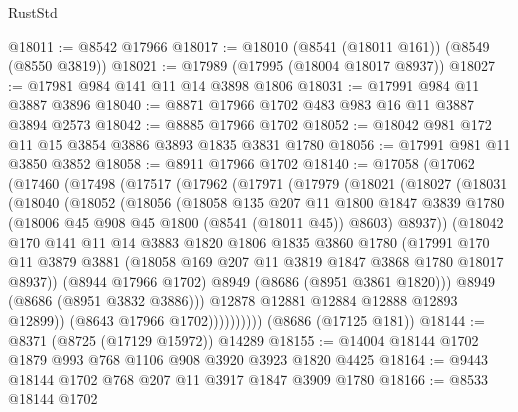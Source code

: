 \begin{lexlean}{RustStd}
\begin{coremodule}
@18011 := @8542 @17966
@18017 := @18010 (@8541 (@18011 @161)) (@8549 (@8550 @3819))
@18021 := @17989 (@17995 (@18004 @18017 @8937))
@18027 := @17981 @984 @141 @11 @14 @3898 @1806
@18031 := @17991 @984 @11 @3887 @3896
@18040 := @8871 @17966 @1702 @483 @983 @16 @11 @3887 @3894 @2573
@18042 := @8885 @17966 @1702
@18052 := @18042 @981 @172 @11 @15 @3854 @3886 @3893 @1835 @3831 @1780
@18056 := @17991 @981 @11 @3850 @3852
@18058 := @8911 @17966 @1702
@18140 := @17058
    (@17062
      (@17460
        (@17498
          (@17517
            (@17962
              (@17971
                (@17979
                  (@18021
                    (@18027
                      (@18031
                        (@18040
                          (@18052
                            (@18056
                              (@18058
                                @135
                                @207
                                @11
                                @1800
                                @1847
                                @3839
                                @1780
                                (@18006 @45 @908 @45 @1800 (@8541 (@18011 @45)) @8603)
                                @8937))
                            (@18042
                              @170
                              @141
                              @11
                              @14
                              @3883
                              @1820
                              @1806
                              @1835
                              @3860
                              @1780
                              (@17991
                                @170
                                @11
                                @3879
                                @3881
                                (@18058 @169 @207 @11 @3819 @1847 @3868 @1780 @18017 @8937))
                              (@8944 @17966 @1702)
                              @8949
                              (@8686 (@8951 @3861 @1820)))
                            @8949
                            (@8686 (@8951 @3832 @3886)))
                          @12878
                          @12881
                          @12884
                          @12888
                          @12893
                          @12899))
                      (@8643 @17966 @1702))))))))))
    (@8686 (@17125 @181))
@18144 := @8371 (@8725 (@17129 @15972)) @14289
@18155 := @14004 @18144 @1702 @1879 @993 @768 @1106 @908 @3920 @3923 @1820 @4425
@18164 := @9443 @18144 @1702 @768 @207 @11 @3917 @1847 @3909 @1780
@18166 := @8533 @18144 @1702

\end{coremodule}
\end{lexlean}
